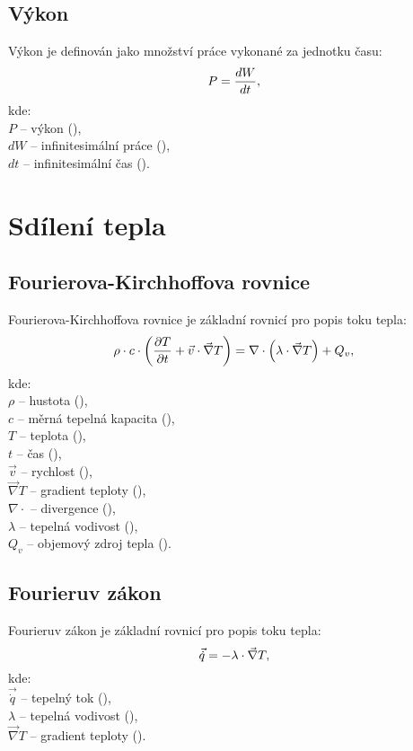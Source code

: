 \documentclass{article}
\begin{document}
\subsection{Výkon}
Výkon je definován jako množství práce vykonané za jednotku času:
\begin{equation}
    P = \frac{dW}{dt},
    \tagaddtext{(\ueqW)}
\end{equation}
kde:\\
$P$ -- výkon (\ueqW),\\
$dW$ -- infinitesimální práce (\ueqJ),\\
$dt$ -- infinitesimální čas (\ueqS).

\newpage



\section{Sdílení tepla}


\subsection{Fourierova-Kirchhoffova rovnice}
Fourierova-Kirchhoffova rovnice je základní rovnicí pro popis toku tepla:
\begin{equation}
    \rho \cdot c \cdot \left( \frac{\partial T}{\partial t} + \vec{v} \cdot \vec{\nabla} T \right) = \nabla \cdot \left( \lambda \cdot \vec{\nabla} T \right) + Q_v,
    \tagaddtext{(\ueqWandMinvcu)}
\end{equation}
kde:\\
$\rho$ -- hustota (\ueqKGandMinvcu),\\
$c$ -- měrná tepelná kapacita (\ueqJandKGinvKinv),\\
$T$ -- teplota (\ueqK),\\
$t$ -- čas (\ueqS),\\
$\vec{v}$ -- rychlost (\ueqMandSinv),\\
$\vec{\nabla} T$ -- gradient teploty (\ueqKandMinv),\\
$\nabla \cdot$ -- divergence (\ueqMinv),\\
$\lambda$ -- tepelná vodivost (\ueqWandMinvKinv),\\
$Q_v$ -- objemový zdroj tepla (\ueqWandMinvcu).


\subsection{Fourieruv zákon}
Fourieruv zákon je základní rovnicí pro popis toku tepla:
\begin{equation}
    \vec{\dot{q}} = - \lambda \cdot \vec{\nabla} T,
    \tagaddtext{(\ueqWandMinvsq)}
\end{equation}
kde:\\
$\vec{\dot{q}}$ -- tepelný tok (\ueqWandMinvsq),\\
$\lambda$ -- tepelná vodivost (\ueqWandMinvKinv),\\
$\vec{\nabla} T$ -- gradient teploty (\ueqKandMinv).
\end{document}
